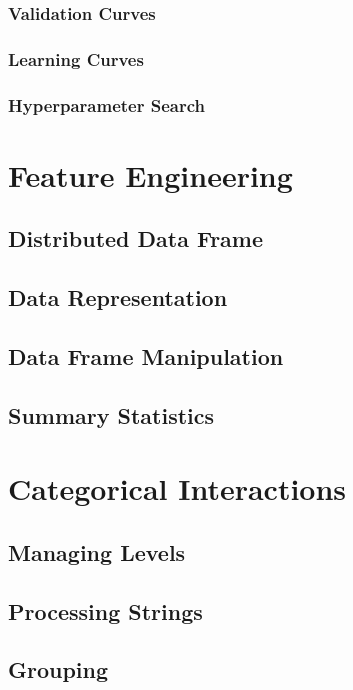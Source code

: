 \subsubsection{Validation Curves}

\subsubsection{Learning Curves}

\subsubsection{Hyperparameter Search}

\section{Feature Engineering}

\subsection{Distributed Data Frame}

\subsection{Data Representation}

\subsection{Data Frame Manipulation}

\subsection{Summary Statistics}

\section{Categorical Interactions}

\subsection{Managing Levels}

\subsection{Processing Strings}

\subsection{Grouping}

